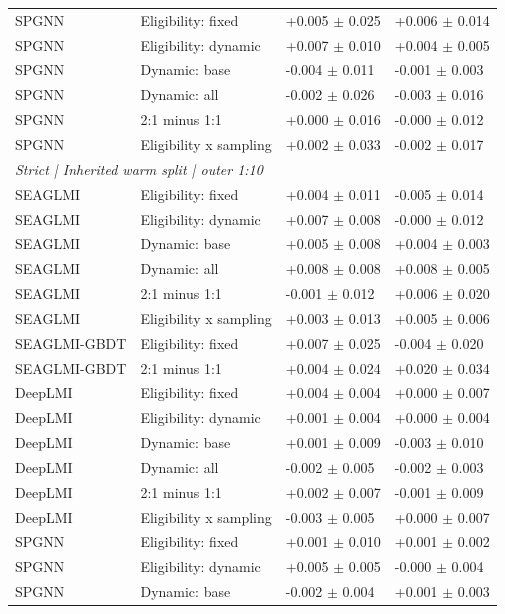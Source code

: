 {\begin{longtable}{llll}
SPGNN & Eligibility: fixed & +0.005 $\pm$ 0.025 & +0.006 $\pm$ 0.014 \\
SPGNN & Eligibility: dynamic & +0.007 $\pm$ 0.010 & +0.004 $\pm$ 0.005 \\
SPGNN & Dynamic: base & -0.004 $\pm$ 0.011 & -0.001 $\pm$ 0.003 \\
SPGNN & Dynamic: all & -0.002 $\pm$ 0.026 & -0.003 $\pm$ 0.016 \\
SPGNN & 2:1 minus 1:1 & +0.000 $\pm$ 0.016 & -0.000 $\pm$ 0.012 \\
SPGNN & Eligibility x sampling & +0.002 $\pm$ 0.033 & -0.002 $\pm$ 0.017 \\
\multicolumn{4}{l}{\textit{Strict | Inherited warm split | outer 1:10}}\\
SEAGLMI & Eligibility: fixed & +0.004 $\pm$ 0.011 & -0.005 $\pm$ 0.014 \\
SEAGLMI & Eligibility: dynamic & +0.007 $\pm$ 0.008 & -0.000 $\pm$ 0.012 \\
SEAGLMI & Dynamic: base & +0.005 $\pm$ 0.008 & +0.004 $\pm$ 0.003 \\
SEAGLMI & Dynamic: all & +0.008 $\pm$ 0.008 & +0.008 $\pm$ 0.005 \\
SEAGLMI & 2:1 minus 1:1 & -0.001 $\pm$ 0.012 & +0.006 $\pm$ 0.020 \\
SEAGLMI & Eligibility x sampling & +0.003 $\pm$ 0.013 & +0.005 $\pm$ 0.006 \\
SEAGLMI-GBDT & Eligibility: fixed & +0.007 $\pm$ 0.025 & -0.004 $\pm$ 0.020 \\
SEAGLMI-GBDT & 2:1 minus 1:1 & +0.004 $\pm$ 0.024 & +0.020 $\pm$ 0.034 \\
DeepLMI & Eligibility: fixed & +0.004 $\pm$ 0.004 & +0.000 $\pm$ 0.007 \\
DeepLMI & Eligibility: dynamic & +0.001 $\pm$ 0.004 & +0.000 $\pm$ 0.004 \\
DeepLMI & Dynamic: base & +0.001 $\pm$ 0.009 & -0.003 $\pm$ 0.010 \\
DeepLMI & Dynamic: all & -0.002 $\pm$ 0.005 & -0.002 $\pm$ 0.003 \\
DeepLMI & 2:1 minus 1:1 & +0.002 $\pm$ 0.007 & -0.001 $\pm$ 0.009 \\
DeepLMI & Eligibility x sampling & -0.003 $\pm$ 0.005 & +0.000 $\pm$ 0.007 \\
SPGNN & Eligibility: fixed & +0.001 $\pm$ 0.010 & +0.001 $\pm$ 0.002 \\
SPGNN & Eligibility: dynamic & +0.005 $\pm$ 0.005 & -0.000 $\pm$ 0.004 \\
SPGNN & Dynamic: base & -0.002 $\pm$ 0.004 & +0.001 $\pm$ 0.003 \\

\end{longtable}}
